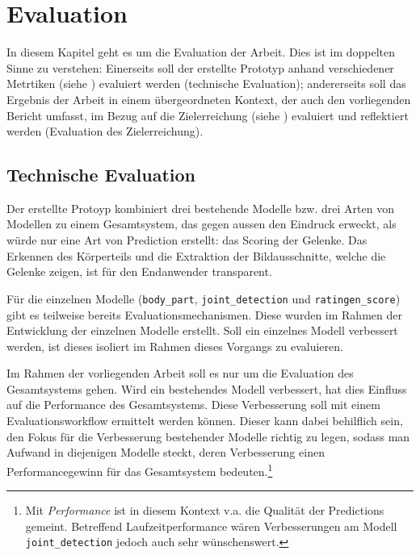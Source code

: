 \section{Evaluation}

In diesem Kapitel geht es um die Evaluation der Arbeit. Dies ist im doppelten Sinne zu verstehen: Einerseits soll der erstellte Prototyp anhand verschiedener Metrtiken (siehe ) evaluiert werden (technische Evaluation); andererseits soll das Ergebnis der Arbeit in einem übergeordneten Kontext, der auch den vorliegenden Bericht umfasst, im Bezug auf die Zielerreichung (siehe ) evaluiert und reflektiert werden (Evaluation des Zielerreichung).

\subsection{Technische Evaluation}
\label{sec:technische-evaluation}

Der erstellte Protoyp kombiniert drei bestehende Modelle bzw. drei Arten von Modellen zu einem Gesamtsystem, das gegen aussen den Eindruck erweckt, als würde nur eine Art von Prediction erstellt: das Scoring der Gelenke. Das Erkennen des Körperteils und die Extraktion der Bildausschnitte, welche die Gelenke zeigen, ist für den Endanwender transparent.

Für die einzelnen Modelle (\texttt{body\_part}, \texttt{joint\_detection} und \texttt{ratingen\_score}) gibt es teilweise bereits Evaluationsmechanismen. Diese wurden im Rahmen der Entwicklung der einzelnen Modelle erstellt. Soll ein einzelnes Modell verbessert werden, ist dieses isoliert im Rahmen dieses Vorgangs zu evaluieren.

Im Rahmen der vorliegenden Arbeit soll es nur um die Evaluation des Gesamtsystems gehen. Wird ein bestehendes Modell verbessert, hat dies Einfluss auf die Performance des Gesamtsystems. Diese Verbesserung soll mit einem Evaluationsworkflow ermittelt werden können. Dieser kann dabei behilflich sein, den Fokus für die Verbesserung bestehender Modelle richtig zu legen, sodass man Aufwand in diejenigen Modelle steckt, deren Verbesserung einen Performancegewinn für das Gesamtsystem bedeuten.\footnote{Mit \textit{Performance} ist in diesem Kontext v.a. die Qualität der Predictions gemeint. Betreffend Laufzeitperformance wären Verbesserungen am Modell \texttt{joint\_detection} jedoch auch sehr wünschenswert.}

